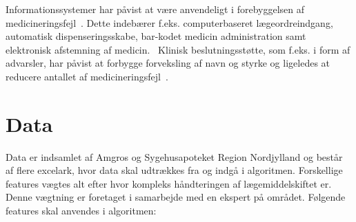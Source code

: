 Informationssystemer har påvist at være anvendeligt i forebyggelsen af medicineringsfejl~\citep{Agrawal2009}. Dette indebærer f.eks. computerbaseret lægeordreindgang, automatisk dispenseringsskabe, bar-kodet medicin administration samt elektronisk afstemning af medicin.~\citep{Agrawal2009} Klinisk beslutningsstøtte, som f.eks. i form af advarsler, har påvist at forbygge forveksling af navn og styrke og ligeledes at reducere antallet af medicineringsfejl~\citep{Campmans2018}.

\section{Data}
Data er indsamlet af Amgros og Sygehusapoteket Region Nordjylland og består af flere excelark, hvor data skal udtrækkes fra og indgå i algoritmen. Forskellige features vægtes alt efter hvor kompleks håndteringen af lægemiddelskiftet er. Denne vægtning er foretaget i samarbejde med en ekspert på området. Følgende features skal anvendes i algoritmen: 
